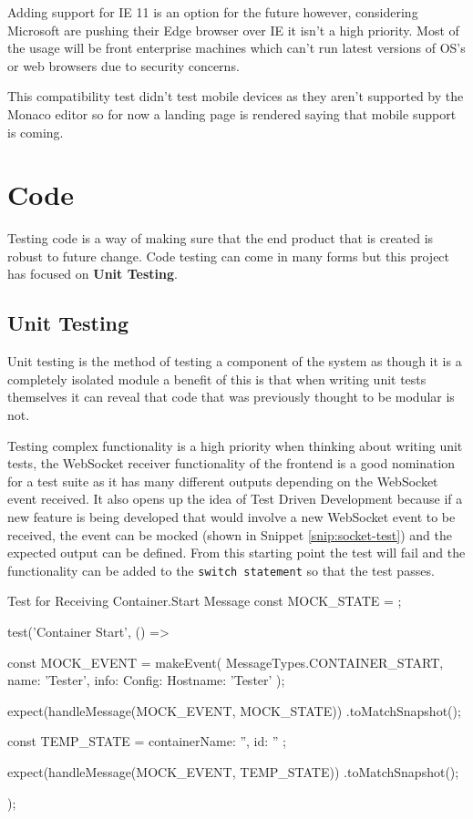 Adding support for IE 11 is an option for the future however, considering Microsoft are pushing their Edge browser over IE it isn't a high priority. Most of the usage will be front enterprise machines which can't run latest versions of OS's or web browsers due to security concerns.

This compatibility test didn't test mobile devices as they aren't supported by the Monaco editor so for now a landing page is rendered saying that mobile support is coming.

\section{Code}

Testing code is a way of making sure that the end product that is created is robust to future change. Code testing can come in many forms but this project has focused on \textbf{Unit Testing}.

\subsection{Unit Testing}

Unit testing is the method of testing a component of the system as though it is a completely isolated module a benefit of this is that when writing unit tests themselves it can reveal that code that was previously thought to be modular is not. 

Testing complex functionality is a high priority when thinking about writing unit tests, the WebSocket receiver functionality of the frontend is a good nomination for a test suite as it has many different outputs depending on the WebSocket event received. It also opens up the idea of Test Driven Development because if a new feature is being developed that would involve a new WebSocket event to be received, the event can be mocked (shown in Snippet \ref{snip:socket-test}) and the expected output can be defined. From this starting point the test will fail and the functionality can be added to the \texttt{switch statement} so that the test passes.

\begin{sexylisting}[label=snip:socket-test]{Test for Receiving Container.Start Message}
const MOCK_STATE = {};

test('Container Start', () => {
    const MOCK_EVENT = makeEvent(
        MessageTypes.CONTAINER_START, {
            name: 'Tester',
            info: { Config: { Hostname: 'Tester' } }
        });

    expect(handleMessage(MOCK_EVENT, MOCK_STATE))
        .toMatchSnapshot();

    const TEMP_STATE = { containerName: '', id: '' };

    expect(handleMessage(MOCK_EVENT, TEMP_STATE))
        .toMatchSnapshot();
});
\end{sexylisting}

